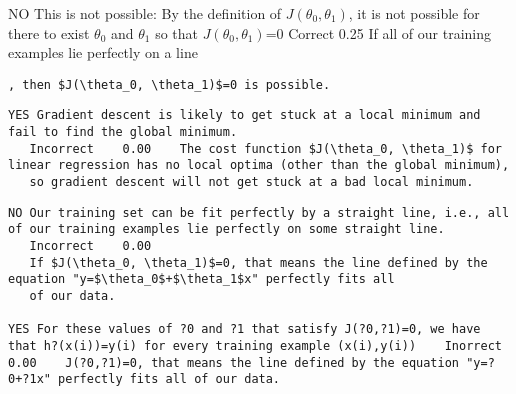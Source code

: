 \documentclass[]{article}
\begin{document}
NO This is not possible: By the definition of $J(\theta_0, \theta_1)$, it is not possible for there to exist $\theta_0$ and $\theta_1$ so that $J(\theta_0, \theta_1)$=0	
   Correct	0.25	If all of our training examples lie perfectly on a line
\begin{verbatim}
, then $J(\theta_0, \theta_1)$=0 is possible.
\end{verbatim}
\begin{verbatim}
YES Gradient descent is likely to get stuck at a local minimum and fail to find the global minimum.	
   Incorrect	0.00	The cost function $J(\theta_0, \theta_1)$ for linear regression has no local optima (other than the global minimum), 
   so gradient descent will not get stuck at a bad local minimum.
\end{verbatim}
\begin{verbatim}
NO Our training set can be fit perfectly by a straight line, i.e., all of our training examples lie perfectly on some straight line.	
   Incorrect	0.00	
   If $J(\theta_0, \theta_1)$=0, that means the line defined by the equation "y=$\theta_0$+$\theta_1$x" perfectly fits all
   of our data.

YES For these values of ?0 and ?1 that satisfy J(?0,?1)=0, we have that h?(x(i))=y(i) for every training example (x(i),y(i))	Inorrect	0.00	J(?0,?1)=0, that means the line defined by the equation "y=?0+?1x" perfectly fits all of our data.
\end{verbatim}
\end{document}
